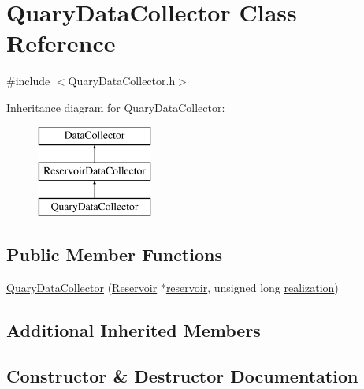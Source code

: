 \hypertarget{classQuaryDataCollector}{}\section{Quary\+Data\+Collector Class Reference}
\label{classQuaryDataCollector}


{\ttfamily \#include $<$Quary\+Data\+Collector.\+h$>$}

Inheritance diagram for Quary\+Data\+Collector\+:\begin{figure}[H]
\begin{center}
\leavevmode
\includegraphics[height=3.000000cm]{classQuaryDataCollector}
\end{center}
\end{figure}
\subsection*{Public Member Functions}
\begin{DoxyCompactItemize}
\item 
\mbox{\hyperlink{classQuaryDataCollector_af2f534feeca2a37104309a595d064cbd_af2f534feeca2a37104309a595d064cbd}{Quary\+Data\+Collector}} (\mbox{\hyperlink{classReservoir}{Reservoir}} $\ast$\mbox{\hyperlink{classReservoirDataCollector_a188c8509a43e7f28362407f7508fde27_a188c8509a43e7f28362407f7508fde27}{reservoir}}, unsigned long \mbox{\hyperlink{classDataCollector_a9ef2887466fe3123aa19ef956a219b96_a9ef2887466fe3123aa19ef956a219b96}{realization}})
\end{DoxyCompactItemize}
\subsection*{Additional Inherited Members}


\subsection{Constructor \& Destructor Documentation}
\mbox{\label{classQuaryDataCollector_af2f534feeca2a37104309a595d064cbd_af2f534feeca2a37104309a595d064cbd}} 
